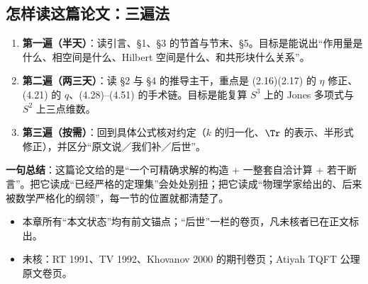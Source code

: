 \subsection{怎样读这篇论文：三遍法}

\begin{enumerate}[leftmargin=2em]
\item \textbf{第一遍（半天）}：读引言、§1、§3 的节首与节末、§5。目标是能说出“作用量是什么、相空间是什么、Hilbert 空间是什么、和共形块什么关系”。
\item \textbf{第二遍（两三天）}：读 §2 与 §4 的推导主干，重点是 (2.16)(2.17) 的 $\eta$ 修正、(4.21) 的 $q$、(4.28)--(4.51) 的手术链。目标是能复算 $S^3$ 上的 Jones 多项式与 $S^2$ 上三点维数。
\item \textbf{第三遍（按需）}：回到具体公式核对约定（$k$ 的归一化、$\Tr$ 的表示、半形式修正），并区分“原文说／我们补／后世”。
\end{enumerate}

\begin{keypoint}
\textbf{一句总结}：这篇论文给的是“一个可精确求解的构造 + 一整套自洽计算 + 若干断言”。把它读成“已经严格的定理集”会处处别扭；把它读成“物理学家给出的、后来被数学严格化的纲领”，每一节的位置就都清楚了。
\end{keypoint}

\begin{boundary}
\begin{itemize}[leftmargin=1.4em]
\item 本章所有“本文状态”均有前文锚点；“后世”一栏的卷页，凡未核者已在正文标出。
\item 未核：RT 1991、TV 1992、Khovanov 2000 的期刊卷页；Atiyah TQFT 公理原文卷页。
\end{itemize}
\end{boundary}
